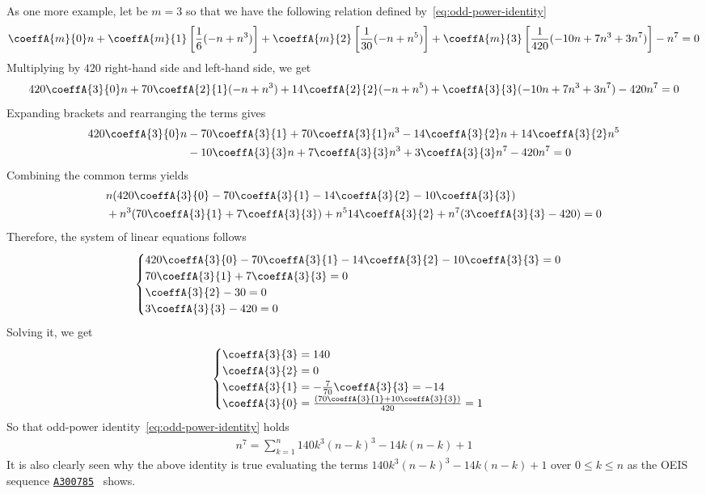 As one more example, let be $m=3$ so that we have the following relation defined by~\eqref{eq:odd-power-identity}
\begin{align*}
    \coeffA{m}{0} n
    + \coeffA{m}{1} \left[ \frac{1}{6} (-n + n^3) \right]
    + \coeffA{m}{2} \left[ \frac{1}{30} (-n + n^5) \right]
    + \coeffA{m}{3} \left[ \frac{1}{420} (-10 n + 7 n^3 + 3 n^7) \right] - n^7 = 0
\end{align*}
Multiplying by $420$ right-hand side and left-hand side, we get
\begin{align*}
    420 \coeffA{3}{0} n + 70 \coeffA{2}{1} (-n + n^3) + 14 \coeffA{2}{2} (-n + n^5) + \coeffA{3}{3} (-10 n + 7 n^3 + 3 n^7) - 420n^7 = 0
\end{align*}
Expanding brackets and rearranging the terms gives
\begin{align*}
    420 \coeffA{3}{0} n
    &- 70 \coeffA{3}{1} + 70 \coeffA{3}{1} n^3 - 14 \coeffA{3}{2} n + 14 \coeffA{3}{2} n^5 \\
    &- 10 \coeffA{3}{3} n + 7 \coeffA{3}{3} n^3 + 3 \coeffA{3}{3} n^7 - 420n^7 = 0
\end{align*}
Combining the common terms yields
\begin{align*}
    &n (420 \coeffA{3}{0} - 70 \coeffA{3}{1} - 14 \coeffA{3}{2} - 10 \coeffA{3}{3}) \\
    &+ n^3 (70 \coeffA{3}{1} + 7 \coeffA{3}{3})
    + n^5 14 \coeffA{3}{2}
    + n^7 (3 \coeffA{3}{3} - 420)
    = 0
\end{align*}
Therefore, the system of linear equations follows
\begin{align*}
    \begin{cases}
        420 \coeffA{3}{0} - 70 \coeffA{3}{1} - 14 \coeffA{3}{2} - 10 \coeffA{3}{3} = 0 \\
        70 \coeffA{3}{1} + 7 \coeffA{3}{3} = 0 \\
        \coeffA{3}{2} - 30 = 0 \\
        3 \coeffA{3}{3} - 420 = 0
    \end{cases}
\end{align*}
Solving it, we get
\begin{align*}
    \begin{cases}
        \coeffA{3}{3} = 140 \\
        \coeffA{3}{2} = 0 \\
        \coeffA{3}{1} = -\frac{7}{70} \coeffA{3}{3} = -14 \\
        \coeffA{3}{0} = \frac{(70 \coeffA{3}{1} + 10 \coeffA{3}{3})}{420} = 1
    \end{cases}
\end{align*}
So that odd-power identity~\eqref{eq:odd-power-identity} holds
\begin{align*}
    n^7 = \sum_{k=1}^{n} 140 k^3 (n-k)^3 - 14k(n-k) + 1
\end{align*}
It is also clearly seen
why the above identity is true evaluating the terms $140 k^3 (n-k)^3 - 14k(n-k) + 1$ over $0 \leq k \leq n$ as
the OEIS sequence \href{https://oeis.org/A300785}{\texttt{A300785}}~\cite{oeis_numerical_triangle_row_sums_give_seventh_powers} shows.


